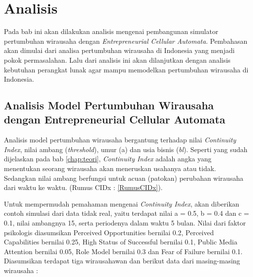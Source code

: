 \chapter{Analisis}
\label{chap:analisis}


Pada bab ini akan dilakukan analisis mengenai pembangunan simulator pertumbuhan wirausaha dengan \textit{Entrepreneurial Cellular Automata}. Pembahasan akan dimulai dari analisa pertumbuhan wirausaha di Indonesia yang menjadi pokok permasalahan. Lalu dari analisis ini akan dilanjutkan dengan analisis kebutuhan perangkat lunak agar mampu memodelkan pertumbuhan wirausaha di Indonesia.


\section{Analisis Model Pertumbuhan Wirausaha dengan Entrepreneurial Cellular Automata}
\label{analisismodelCA}

Analisis model pertumbuhan wirausaha bergantung terhadap nilai \textit{Continuity Index}, nilai ambang (\textit{threshold}), umur (a) dan usia bisnis (\textit{bl}). Seperti yang sudah dijelaskan pada bab \ref{chap:teori}, \textit{Continuity Index} adalah angka yang menentukan seorang wirausaha akan meneruskan usahanya atau tidak. Sedangkan nilai ambang berfungsi untuk acuan (patokan) perubahan wirausaha dari waktu ke waktu. (Rumus CIDx : \ref{RumusCIDx}).


Untuk mempermudah pemahaman mengenai \textit{Continuity Index}, akan diberikan contoh simulasi dari data tidak real, yaitu terdapat nilai a = 0.5, b = 0.4 dan c = 0.1, nilai ambangnya 15, serta periodenya dalam waktu 5 bulan. Nilai dari faktor psikologis diasumsikan Perceived Opportunities bernilai 0.2, Perceived Capabilities bernilai 0.25, High Status of Successful bernilai 0.1, Public Media Attention bernilai 0.05, Role Model bernilai 0.3 dan Fear of Failure bernilai 0.1. Diasumsikan terdapat tiga wirausahawan dan berikut data dari masing-masing wirausaha :
				
